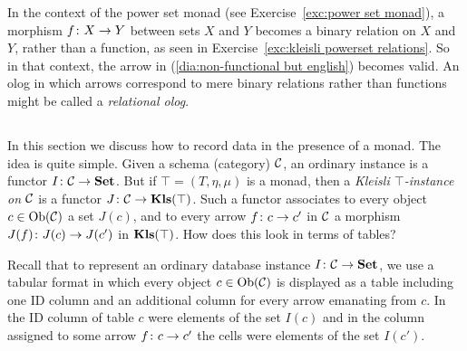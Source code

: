 \documentclass[CT4S-EN-RU]{subfiles}
\begin{document}
\begin{blockRUS}
\end{blockRUS}

\begin{blockENG}
In the context of the power set monad (see Exercise~\ref{exc:power set monad}), a morphism $f\colon X\rightarrow Y$ between sets $X$ and $Y$ becomes a binary relation on $X$ and $Y$, rather than a function, as seen in Exercise~\ref{exc:kleisli powerset relations}. So in that context, the arrow in (\ref{dia:non-functional but english}) becomes valid. An olog in which arrows correspond to mere binary relations rather than functions might be called a {\em relational olog}.
\end{blockENG}

\begin{blockRUS}
\end{blockRUS}


\subsection{}\label{sec:monads in db}

\begin{blockENG}
In this section we discuss how to record data in the presence of a monad. The idea is quite simple. Given a schema (category) $\mathcal{C}$, an ordinary instance is a functor $I\colon\mathcal{C}\rightarrow{\mathbf{Set}}$. But if $\top=(T,\eta,\mu)$ is a monad, then a {\em Kleisli $\top$-instance on $\mathcal{C}$} is a functor $J\colon\mathcal{C}\rightarrow{\mathbf{Kls}}(\top)$. Such a functor associates to every object $c\in\textnormal{Ob}(\mathcal{C})$ a set $J(c)$, and to every arrow $f\colon c\rightarrow c'$ in $\mathcal{C}$ a morphism $J(f)\colon J(c)\rightarrow J(c')$ in ${\mathbf{Kls}}(\top)$. How does this look in terms of tables?
\end{blockENG}

\begin{blockRUS}
\end{blockRUS}

\begin{blockENG}
Recall that to represent an ordinary database instance $I\colon\mathcal{C}\rightarrow{\mathbf{Set}}$, we use a tabular format in which every object $c\in\textnormal{Ob}(\mathcal{C})$ is displayed as a table including one ID column and an additional column for every arrow emanating from $c$. In the ID column of table $c$ were elements of the set $I(c)$ and in the column assigned to some arrow $f\colon c\rightarrow c'$ the cells were elements of the set $I(c')$. 
\end{blockENG}
\end{document}
